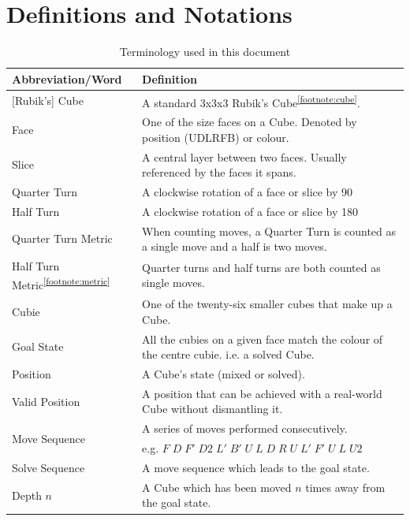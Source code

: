 \documentclass{report}
\begin{document}
	\chapter{Definitions and Notations}
	\begin{table}[htbp]
		\def\arraystretch{1.2}
		\centering
		\caption{Terminology used in this document}
		\label{tab:abbrev}
		\begin{tabular}{m{}m{}}
			\toprule
			\textbf{Abbreviation/Word} & \textbf{Definition} \\
			\midrule
			{[Rubik's]} Cube 		& 	A standard 3x3x3 Rubik's Cube\textsuperscript{\ref{footnote:cube}}. \\
			Face 				& 	One of the size faces on a Cube. Denoted by position (UDLRFB) or colour.\\
			Slice				&	A central layer between two faces. Usually referenced by the faces it spans. \\
			Quarter Turn		&	A clockwise rotation of a face or slice by 90\degree \\
			Half Turn			&	A clockwise rotation of a face or slice by 180\degree \\
			Quarter Turn Metric	&	When counting moves, a Quarter Turn is counted as a single move and a half is two moves. \\
			Half Turn Metric\textsuperscript{\ref{footnote:metric}}	&	Quarter turns and half turns are both counted as single moves. \\
			Cubie				&	One of the twenty-six smaller cubes that make up a Cube. \\
			Goal State			&	All the cubies on a given face match the colour of the centre cubie. i.e. a solved Cube. \\
			Position			&	A Cube's state (mixed or solved). \\
			Valid Position		&	A position that can be achieved with a real-world Cube without dismantling it. \\
			\multirow{ 2}{*}{Move Sequence}		&	A series of moves performed consecutively. \\
			&	e.g. $F\;D\;F'\;D2\;L'\;B'\;U\;L\;D\;R\;U\;L'\;F'\;U\;L\;U2$ \\
			Solve Sequence		&	A move sequence which leads to the goal state. \\
			Depth $n$			&	A Cube which has been moved $n$ times away from the goal state. \\
			\bottomrule
		\end{tabular}
	\end{table}
\end{document}
